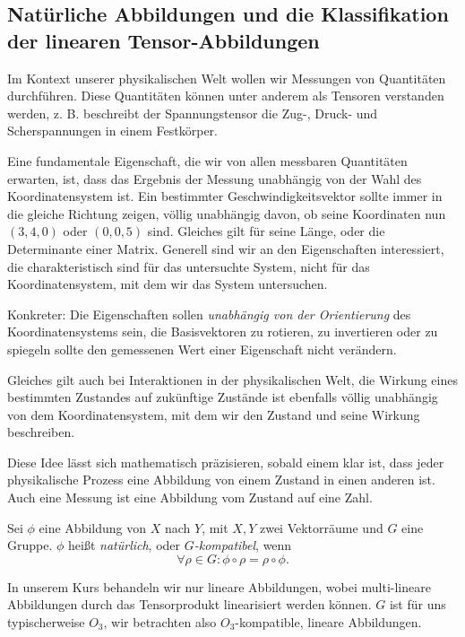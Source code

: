 \subsection{Natürliche Abbildungen und die Klassifikation der linearen Tensor-Abbildungen}
Im Kontext unserer physikalischen Welt wollen wir Messungen von Quantitäten durchführen. Diese Quantitäten können unter anderem als Tensoren verstanden werden, z. B. beschreibt der Spannungstensor die Zug-, Druck- und Scherspannungen in einem Festkörper.

Eine fundamentale Eigenschaft, die wir von allen messbaren Quantitäten erwarten, ist, dass das Ergebnis der Messung unabhängig von der Wahl des Koordinatensystem ist. Ein bestimmter Geschwindigkeitsvektor sollte immer in die gleiche Richtung zeigen, völlig unabhängig davon, ob seine Koordinaten nun $(3,4,0)$ oder $(0,0,5)$ sind. Gleiches gilt für seine Länge, oder die Determinante einer Matrix. Generell sind wir an den Eigenschaften interessiert, die charakteristisch sind für das untersuchte System, nicht für das Koordinatensystem, mit dem wir das System untersuchen.

Konkreter: Die Eigenschaften sollen \emph{unabhängig von der Orientierung} des Koordinatensystems sein, die Basisvektoren zu rotieren, zu invertieren oder zu spiegeln sollte den gemessenen Wert einer Eigenschaft nicht verändern.

Gleiches gilt auch bei Interaktionen in der physikalischen Welt, die Wirkung eines bestimmten Zustandes auf zukünftige Zustände ist ebenfalls völlig unabhängig von dem Koordinatensystem, mit dem wir den Zustand und seine Wirkung beschreiben.

Diese Idee lässt sich mathematisch präzisieren, sobald einem klar ist, dass jeder physikalische Prozess eine Abbildung von einem Zustand in einen anderen ist. Auch eine Messung ist eine Abbildung vom Zustand auf eine Zahl.

\begin{definition}
	Sei $\phi$ eine Abbildung von $X$ nach $Y$, mit $X,Y$ zwei Vektorräume und $G$ eine Gruppe. $\phi$ heißt \emph{natürlich}, oder \emph{$G$-kompatibel}, wenn 
	\begin{equation*}
		\forall \rho\in G: \phi \circ \rho = \rho \circ \phi.
	\end{equation*}
\end{definition}
In unserem Kurs behandeln wir nur lineare Abbildungen, wobei multi-lineare Abbildungen durch das Tensorprodukt linearisiert werden können. $G$ ist für uns typischerweise $O_3$, wir betrachten also $O_3$-kompatible, lineare Abbildungen.

